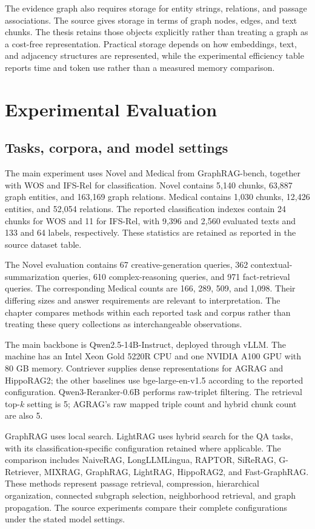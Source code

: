 The evidence graph also requires storage for entity strings, relations, and passage associations. The source gives storage in terms of graph nodes, edges, and text chunks. The thesis retains those objects explicitly rather than treating a graph as a cost-free representation. Practical storage depends on how embeddings, text, and adjacency structures are represented, while the experimental efficiency table reports time and token use rather than a measured memory comparison.

\section{Experimental Evaluation}
\label{sec:agrag:experiments}
\subsection{Tasks, corpora, and model settings}
The main experiment uses Novel and Medical from GraphRAG-bench, together with WOS and IFS-Rel for classification. Novel contains 5,140 chunks, 63,887 graph entities, and 163,169 graph relations. Medical contains 1,030 chunks, 12,426 entities, and 52,054 relations. The reported classification indexes contain 24 chunks for WOS and 11 for IFS-Rel, with 9,396 and 2,560 evaluated texts and 133 and 64 labels, respectively. These statistics are retained as reported in the source dataset table.

The Novel evaluation contains 67 creative-generation queries, 362 contextual-summarization queries, 610 complex-reasoning queries, and 971 fact-retrieval queries. The corresponding Medical counts are 166, 289, 509, and 1,098. Their differing sizes and answer requirements are relevant to interpretation. The chapter compares methods within each reported task and corpus rather than treating these query collections as interchangeable observations.

The main backbone is Qwen2.5-14B-Instruct, deployed through vLLM. The machine has an Intel Xeon Gold 5220R CPU and one NVIDIA A100 GPU with 80 GB memory. Contriever supplies dense representations for AGRAG and HippoRAG2; the other baselines use bge-large-en-v1.5 according to the reported configuration. Qwen3-Reranker-0.6B performs raw-triplet filtering. The retrieval top-$k$ setting is 5; AGRAG's raw mapped triple count and hybrid chunk count are also 5.

GraphRAG uses local search. LightRAG uses hybrid search for the QA tasks, with its classification-specific configuration retained where applicable. The comparison includes NaiveRAG, LongLLMLingua, RAPTOR, SiReRAG, G-Retriever, MIXRAG, GraphRAG, LightRAG, HippoRAG2, and Fast-GraphRAG. These methods represent passage retrieval, compression, hierarchical organization, connected subgraph selection, neighborhood retrieval, and graph propagation. The source experiments compare their complete configurations under the stated model settings.

